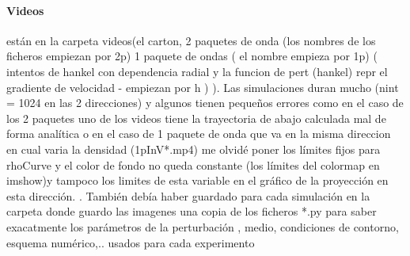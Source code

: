 \documentclass{article}
\begin{document}
\paragraph{Videos}
\begin{description}
\item están en la carpeta videos(el carton, 2 paquetes de onda (los nombres de los ficheros empiezan por 2p) 1 paquete de ondas ( el nombre empieza por 1p)
( intentos de hankel con dependencia radial y la funcion de pert (hankel) repr el gradiente de velocidad - empiezan por h )
 ). Las simulaciones duran mucho (nint = 1024 en las 2 direcciones)
y algunos tienen pequeños errores como en el caso de los  2 paquetes uno de los videos tiene la trayectoria de abajo calculada mal de forma analítica o en el caso de 1 paquete de onda que  va en la misma direccion en cual varia la densidad (1pInV*.mp4)
me olvidé poner los límites fijos para rhoCurve y  el 
color de fondo  no queda constante (los límites del colormap en imshow)y tampoco los limites de esta variable en el gráfico de la proyección en esta dirección.
. También debía haber guardado para cada simulación en la carpeta donde guardo las imagenes una copia de los ficheros *.py para saber exacatmente los parámetros de la perturbación , medio, condiciones de contorno,  esquema numérico,.. usados para cada experimento
\end{description}
\end{document}

